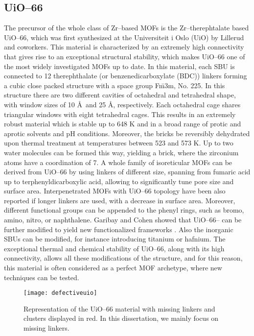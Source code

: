 \subsection*{UiO--66}
The precursor of the whole class of Zr--based MOFs is the Zr--therephtalate based UiO--66, which was first synthesized at the Universiteit i Oslo (UiO) by Lillerud and coworkers\cite{cavka2008new}. This material is characterized by an extremely high connectivity that gives rise to an exceptional structural stability, which makes UiO--66 one of the most widely investigated MOFs up to date. In this material, each  SBU is connected to 12 therephthalate (or benzenedicarboxylate (BDC)) linkers forming a cubic close packed structure with a space group F\={m}3m, No. 225. In this structure there are two different cavities of octahedral and tetrahedral shape, with window sizes of 10 \AA\ and 25 \AA, respectively. Each octahedral cage shares triangular windows with eight tetrahedral cages. 
This results in an extremely robust material which is stable up to 648 K and in a broad range of protic and aprotic solvents and pH conditions. Moreover, the  bricks be reversibly dehydrated upon thermal treatment at temperatures between 523 and 573 K. Up to two water molecules can be formed this way, yielding a  brick, where the zirconium atoms have a coordination of 7\cite{valenzano2011disclosing}. 
\npar
A whole family of isoreticular MOFs can be derived from UiO--66 by using linkers of different size, spanning from fumaric acid\cite{wissmann2012modulated} up to terphenyldicarboxylic acid\cite{schaate2011modulated}, allowing to significantly tune pore size and surface area. Interpenetrated MOFs with UiO--66 topology have been also reported if longer linkers are used\cite{schaate2011porous}, with a decrease in surface area. Moreover, different functional groups can be appended to the phenyl rings, such as bromo, amino, nitro, or naphthalene. Garibay and Cohen showed that UiO--66-- can be further modified to yield new functionalized frameworks \cite{garibay2010isoreticular}. Also the inorganic SBUs can be modified, for instance introducing titanium or hafnium\cite{kim2012postsynthetic}. The exceptional thermal and chemical stability of UiO--66, along with its high connectivity, allows all these modifications of the structure, and for this reason, this material is often considered as a perfect MOF archetype, where new techniques can be tested. 

\begin{figure}[!htbp]
	\centering
 	\texttt{[image: defectiveuio]}
	\caption{Representation of the UiO--66 material with missing linkers and clusters displayed in red. In this dissertation, we mainly focus on missing linkers.}
	\label{fig:defectiveuio}
\end{figure}

